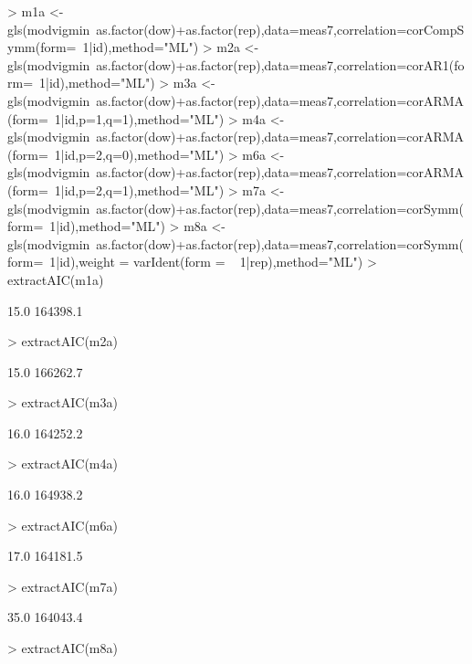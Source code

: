 \documentclass[11pt]{article}
\begin{document}
\begin{Schunk}
\begin{Sinput}
> m1a <- gls(modvigmin~as.factor(dow)+as.factor(rep),data=meas7,correlation=corCompSymm(form=~1|id),method="ML")
> m2a <- gls(modvigmin~as.factor(dow)+as.factor(rep),data=meas7,correlation=corAR1(form=~1|id),method="ML")
> m3a <- gls(modvigmin~as.factor(dow)+as.factor(rep),data=meas7,correlation=corARMA(form=~1|id,p=1,q=1),method="ML")
> m4a <- gls(modvigmin~as.factor(dow)+as.factor(rep),data=meas7,correlation=corARMA(form=~1|id,p=2,q=0),method="ML")
> m6a <- gls(modvigmin~as.factor(dow)+as.factor(rep),data=meas7,correlation=corARMA(form=~1|id,p=2,q=1),method="ML")
> m7a <- gls(modvigmin~as.factor(dow)+as.factor(rep),data=meas7,correlation=corSymm(form=~1|id),method="ML")
> m8a <- gls(modvigmin~as.factor(dow)+as.factor(rep),data=meas7,correlation=corSymm(form=~1|id),weight = varIdent(form = ~ 1|rep),method="ML")
> extractAIC(m1a)
\end{Sinput}
\begin{Soutput}
[1]     15.0 164398.1
\end{Soutput}
\begin{Sinput}
> extractAIC(m2a)
\end{Sinput}
\begin{Soutput}
[1]     15.0 166262.7
\end{Soutput}
\begin{Sinput}
> extractAIC(m3a)
\end{Sinput}
\begin{Soutput}
[1]     16.0 164252.2
\end{Soutput}
\begin{Sinput}
> extractAIC(m4a)
\end{Sinput}
\begin{Soutput}
[1]     16.0 164938.2
\end{Soutput}
\begin{Sinput}
> extractAIC(m6a)
\end{Sinput}
\begin{Soutput}
[1]     17.0 164181.5
\end{Soutput}
\begin{Sinput}
> extractAIC(m7a)
\end{Sinput}
\begin{Soutput}
[1]     35.0 164043.4
\end{Soutput}
\begin{Sinput}
> extractAIC(m8a)
\end{Sinput}
\begin{Soutput}

\end{Soutput}
\end{Schunk}
\end{document}
